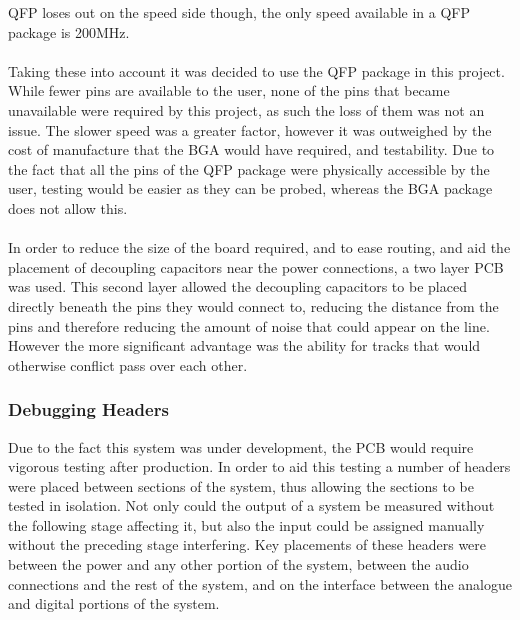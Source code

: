 QFP loses out on the speed side though, the only speed available in a QFP package is 200MHz.
\\
\\
Taking these into account it was decided to use the QFP package in this project.
While fewer pins are available to the user, none of the pins that became unavailable were required by this project, as such the loss of them was not an issue.
The slower speed was a greater factor, however it was outweighed by the cost of manufacture that the BGA would have required, and testability.
Due to the fact that all the pins of the QFP package were physically accessible by the user, testing would be easier as they can be probed, whereas the BGA package does not allow this.
\\
\\
In order to reduce the size of the board required, and to ease routing, and aid the placement of decoupling capacitors near the power connections, a two layer PCB was used.
This second layer allowed the decoupling capacitors to be placed directly beneath the pins they would connect to, reducing the distance from the pins and therefore reducing the amount of noise that could appear on the line.
However the more significant advantage was the ability for tracks that would otherwise conflict pass over each other.

\subsubsection{Debugging Headers}
Due to the fact this system was under development, the PCB would require vigorous testing after production.
In order to aid this testing a number of headers were placed between sections of the system, thus allowing the sections to be tested in isolation.
Not only could the output of a system be measured without the following stage affecting it, but also the input could be assigned manually without the preceding stage interfering.
Key placements of these headers were between the power and any other portion of the system, between the audio connections and the rest of the system, and on the interface between the analogue and digital portions of the system.


